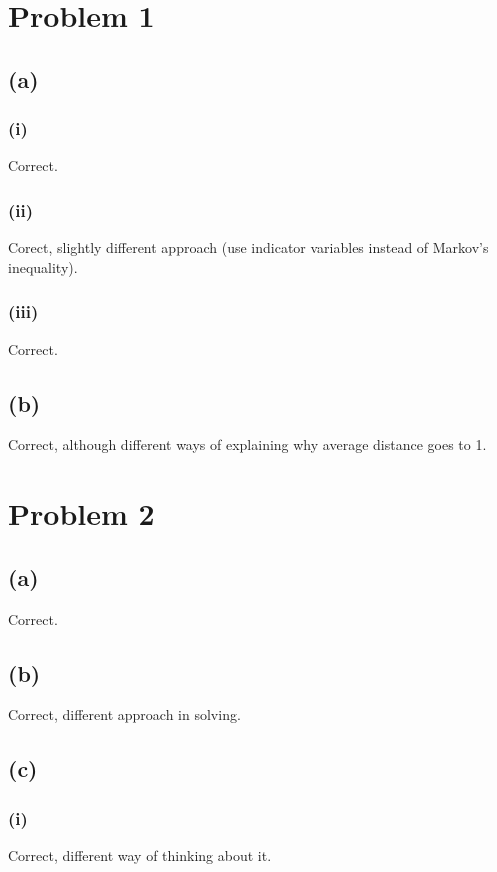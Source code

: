 \documentclass{article}
\begin{document}
\section*{Problem 1}
\subsection*{(a)}
\subsubsection*{(i)}
Correct.

\subsubsection*{(ii)}
Corect, slightly different approach (use indicator variables instead
of Markov's inequality).

\subsubsection*{(iii)}
Correct.

\subsection*{(b)}
Correct, although different ways of explaining why average distance goes to 1.

\section*{Problem 2}
\subsection*{(a)}
Correct.

\subsection*{(b)}
Correct, different approach in solving.

\subsection*{(c)}
\subsubsection*{(i)}
Correct, different way of thinking about it.
\end{document}
